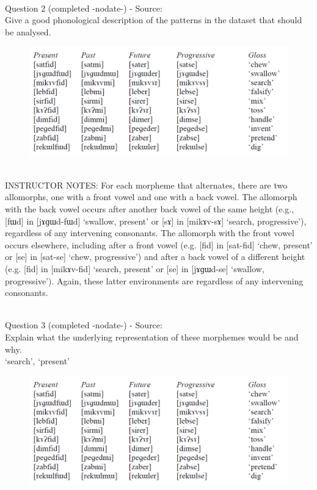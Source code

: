 \documentclass[12pt]{article}
\begin{document}
~\\

{\large Question 2} (completed -nodate-) - Source: \\

Give a good phonological description of the patterns in the dataset that should be analysed.\\

\begin{figure}[H]
\includegraphics{../images/final_dataset.png}
\end{figure}

~\\
INSTRUCTOR NOTES: For each morpheme that alternates, there are two allomorphs, one with a front vowel and one with a back vowel. The allomorph with the back vowel occurs after another back vowel of the same height (e.g., [fɯd] in [jɤɡɯd-fɯd] ‘swallow, present’ or [sɤ] in [mikɤv-sɤ] ‘search, progressive’), regardless of any intervening consonants. The allomorph with the front vowel occurs elsewhere, including after a front vowel (e.g. [fid] in [sat-fid] ‘chew, present’ or [se] in [sat-se] ‘chew, progressive’) and after a back vowel of a different height (e.g. [fid] in [mikɤv-fid] ‘search, present’ or [se] in [jɤɡɯd-se] ‘swallow, progressive’). Again, these latter environments are regardless of any intervening consonants.


~\\

{\large Question 3} (completed -nodate-) - Source: \\

Explain what the underlying representation of these morphemes would be and why.\\

`search', `present'

\begin{figure}[H]
\includegraphics{../images/final_dataset.png}
\end{figure}
\end{document}
